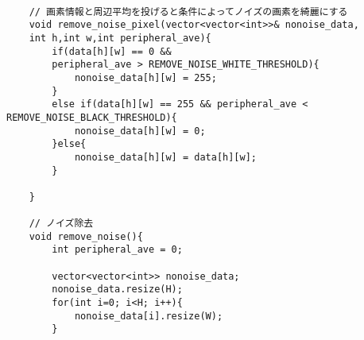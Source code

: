   \begin{lstlisting}[basicstyle=\ttfamily\footnotesize, frame=single]

  	// 画素情報と周辺平均を投げると条件によってノイズの画素を綺麗にする
	void remove_noise_pixel(vector<vector<int>>& nonoise_data,
    int h,int w,int peripheral_ave){
		if(data[h][w] == 0 && 
        peripheral_ave > REMOVE_NOISE_WHITE_THRESHOLD){
			nonoise_data[h][w] = 255;
		}
		else if(data[h][w] == 255 && peripheral_ave < REMOVE_NOISE_BLACK_THRESHOLD){
			nonoise_data[h][w] = 0;
		}else{
			nonoise_data[h][w] = data[h][w];
		}
	
	}

	// ノイズ除去
	void remove_noise(){
		int peripheral_ave = 0;

		vector<vector<int>> nonoise_data;
		nonoise_data.resize(H);
		for(int i=0; i<H; i++){
			nonoise_data[i].resize(W);
		}
		

\end{lstlisting}

